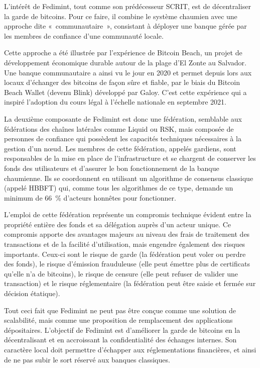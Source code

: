 
L'intérêt de Fedimint, tout comme son prédécesseur SCRIT, est de décentraliser la garde de bitcoins. Pour ce faire, il combine le système chaumien avec une approche dite «~communautaire~», consistant à déployer une banque gérée par les membres de confiance d'une communauté locale.

Cette approche a été illustrée par l'expérience de Bitcoin Beach, un projet de développement économique durable autour de la plage d'El Zonte au Salvador. Une banque communautaire a ainsi vu le jour en 2020 et permet depuis lors aux locaux d'échanger des bitcoins de façon sûre et fiable, par le biais du Bitcoin Beach Wallet (devenu Blink) développé par Galoy. C'est cette expérience qui a inspiré l'adoption du cours légal à l'échelle nationale en septembre 2021.

La deuxième composante de Fedimint est donc une fédération, semblable aux fédérations des chaînes latérales comme Liquid ou RSK, mais composée de personnes de confiance qui possèdent les capacités techniques nécessaires à la gestion d'un nœud. Les membres de cette fédération, appelés gardiens, sont responsables de la mise en place de l'infrastructure et se chargent de conserver les fonds des utilisateurs et d'assurer le bon fonctionnement de la banque chaumienne. Ils se coordonnent en utilisant un algorithme de consensus classique (appelé HBBFT) qui, comme tous les algorithmes de ce type, demande un minimum de 66~\% d'acteurs honnêtes pour fonctionner. %

L'emploi de cette fédération représente un compromis technique évident entre la propriété entière des fonds et sa délégation auprès d'un acteur unique. Ce compromis apporte des avantages majeurs au niveau des frais de traitement des transactions et de la facilité d'utilisation, mais engendre également des risques importants. Ceux-ci sont le risque de garde (la fédération peut voler ou perdre des fonds), le risque d'émission frauduleuse (elle peut émettre plus de certificats qu'elle n'a de bitcoins), le risque de censure (elle peut refuser de valider une transaction) et le risque réglementaire (la fédération peut être saisie et fermée sur décision étatique).

Tout ceci fait que Fedimint ne peut pas être conçue comme une solution de scalabilité, mais comme une proposition de remplacement des applications dépositaires. L'objectif de Fedimint est d'améliorer la garde de bitcoins en la décentralisant et en accroissant la confidentialité des échanges internes. Son caractère local doit permettre d'échapper aux réglementations financières, et ainsi de ne pas subir le sort réservé aux banques classiques.

